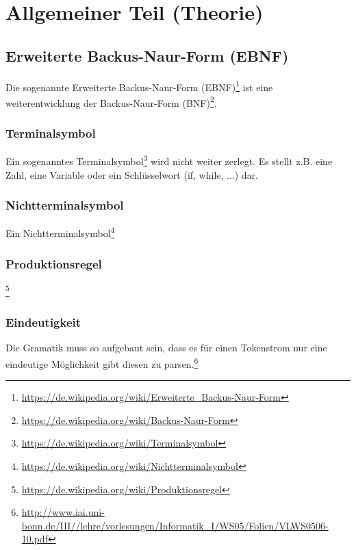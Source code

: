 

\section{Allgemeiner Teil (Theorie)}

\subsection{Erweiterte Backus-Naur-Form (EBNF)}

Die sogenannte Erweiterte Backus-Naur-Form (EBNF)\footnote{\url{https://de.wikipedia.org/wiki/Erweiterte_Backus-Naur-Form}} ist eine weiterentwicklung der Backus-Naur-Form (BNF)\footnote{\url{https://de.wikipedia.org/wiki/Backus-Naur-Form}}.

\subsubsection{Terminalsymbol}

Ein sogenanntes Terminalsymbol\footnote{\url{https://de.wikipedia.org/wiki/Terminalsymbol}} wird nicht weiter zerlegt. Es stellt z.B. eine Zahl, eine Variable oder ein Schlüsselwort (if, while, ...) dar.

\subsubsection{Nichtterminalsymbol}

Ein Nichtterminalsymbol\footnote{\url{https://de.wikipedia.org/wiki/Nichtterminalsymbol}}

\subsubsection{Produktionsregel}

\footnote{\url{https://de.wikipedia.org/wiki/Produktionsregel}}

\subsubsection{Eindeutigkeit}

Die Gramatik muss so aufgebaut sein, dass es für einen Tokenstrom nur eine eindeutige Möglichkeit gibt diesen zu parsen.\footnote{\url{http://www.iai.uni-bonn.de/III//lehre/vorlesungen/Informatik_I/WS05/Folien/VLWS0506-10.pdf}}

